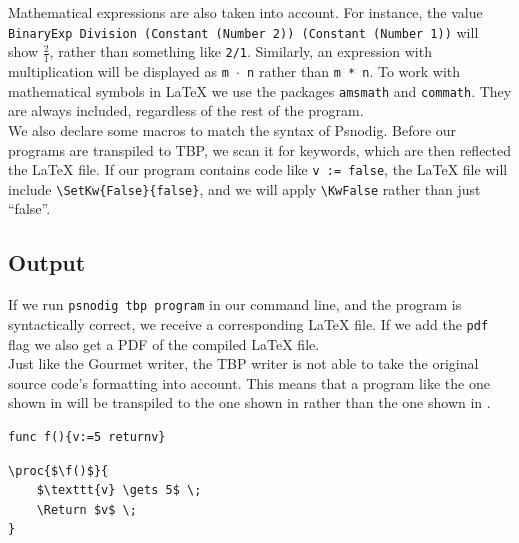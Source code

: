 Mathematical expressions are also taken into account. For instance, the value \texttt{BinaryExp Division (Constant (Number 2)) (Constant (Number 1))} will show $\frac{2}{1}$, rather than something like \texttt{2/1}. Similarly, an expression with multiplication will be displayed as \texttt{m $\cdot$ n} rather than \texttt{m * n}. To work with mathematical symbols in LaTeX we use the packages \texttt{amsmath} and \texttt{commath}. They are always included, regardless of the rest of the program. \\

We also declare some macros to match the syntax of Psnodig. Before our programs are transpiled to TBP, we scan it for keywords, which are then reflected the LaTeX file. If our program contains code like \texttt{v := false}, the LaTeX file will include \texttt{\textbackslash SetKw\{False\}\{false\}}, and we will apply \texttt{\textbackslash KwFalse} rather than just ``false''.

\subsection{Output}

If we run \texttt{psnodig tbp program} in our command line, and the program is syntactically correct, we receive a corresponding LaTeX file. If we add the \texttt{pdf} flag we also get a PDF of the compiled LaTeX file. \\

Just like the Gourmet writer, the TBP writer is not able to take the original source code's formatting into account. This means that a program like the one shown in  will be transpiled to the one shown in  rather than the one shown in . \\

\begin{lstlisting}[caption={A Gourmet function which declares a variable and returns it.}, captionpos=b, label={Gourmet f}]
func f(){v:=5 returnv}
\end{lstlisting}

\begin{lstlisting}[caption={How Psnodig transpiles the program from \Cref{Gourmet f}.}, captionpos=b, label={How Psnodig transpiles the program from}]
\proc{$\f()$}{
    $\texttt{v} \gets 5$ \;
    \Return $v$ \;
}
\end{lstlisting}

